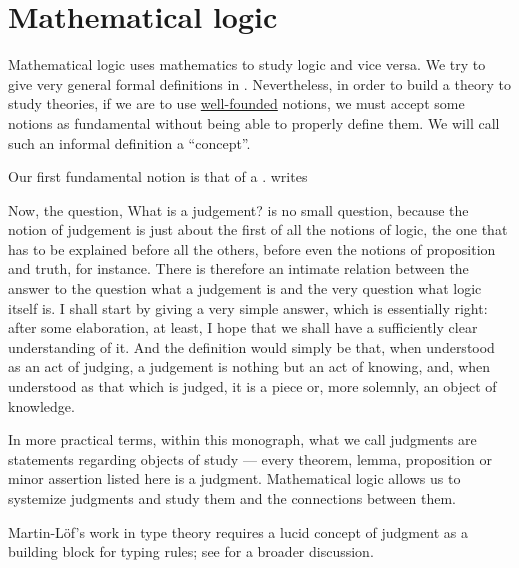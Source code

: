 \chapter{Mathematical logic}\label{ch:mathematical_logic}

Mathematical logic uses mathematics to study logic and vice versa. We try to give very general formal definitions in . Nevertheless, in order to build a theory to study theories, if we are to use \hyperref[def:well_founded_relation]{well-founded} notions, we must accept some notions as fundamental without being able to properly define them. We will call such an informal definition a \enquote{concept}.

\begin{concept}\label{con:judgment}
  Our first fundamental notion is that of a .  writes
  \begin{displayquote}
    Now, the question, What is a judgement? is no small question, because the notion of judgement is just about the first of all the notions of logic, the one that has to be explained before all the others, before even the notions of proposition and truth, for instance. There is therefore an intimate relation between the answer to the question what a judgement is and the very question what logic itself is. I shall start by giving a very simple answer, which is essentially right: after some elaboration, at least, I hope that we shall have a sufficiently clear understanding of it. And the definition would simply be that, when understood as an act of judging, a judgement is nothing but an act of knowing, and, when understood as that which is judged, it is a piece or, more solemnly, an object of knowledge.
  \end{displayquote}
\end{concept}
\begin{comments}
  \item In more practical terms, within this monograph, what we call judgments are statements regarding objects of study --- every theorem, lemma, proposition or minor assertion listed here is a judgment. Mathematical logic allows us to systemize judgments and study them and the connections between them.

  \item Martin-L\"of's work in type theory requires a lucid concept of judgment as a building block for typing rules; see  for a broader discussion.
\end{comments}

